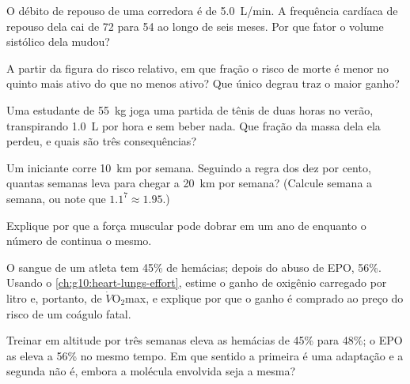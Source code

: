 \begin{exercise}[$\star\star$]\label{exo:g10:sport-and-health:7}
O débito de repouso de uma corredora é de \qty{5.0}{L/min}. A
frequência cardíaca de repouso dela cai de 72 para 54 ao longo de seis
meses. Por que fator o volume sistólico dela mudou?
\end{exercise}

\begin{exercise}[$\star\star$]\label{exo:g10:sport-and-health:8}
A partir da figura do risco relativo, em que fração o risco de morte é
menor no quinto mais ativo do que no menos ativo? Que único degrau traz
o maior ganho?
\end{exercise}

\begin{exercise}[$\star\star$]\label{exo:g10:sport-and-health:9}
Uma estudante de \qty{55}{kg} joga uma partida de tênis de duas horas
no verão, transpirando \qty{1.0}{L} por hora e sem beber nada. Que
fração da massa dela ela perdeu, e quais são três consequências?
\end{exercise}

\begin{exercise}[$\star\star$]\label{exo:g10:sport-and-health:10}
Um iniciante corre \qty{10}{km} por semana. Seguindo a regra dos dez por
cento, quantas semanas leva para chegar a \qty{20}{km} por semana?
(Calcule semana a semana, ou note que $1.1^7 \approx 1.95$.)
\end{exercise}

\begin{exercise}[$\star\star$]\label{exo:g10:sport-and-health:11}
Explique por que a força muscular pode dobrar em um ano de 
enquanto o número de  continua o mesmo.
\end{exercise}

\begin{exercise}[$\star\star\star$]\label{exo:g10:sport-and-health:12}
O sangue de um atleta tem 45\% de hemácias; depois do abuso de EPO,
56\%. Usando o \cref{ch:g10:heart-lungs-effort}, estime o ganho de
oxigênio carregado por litro e, portanto, de
$\dot V\!\mathrm{O_2}$max, e explique por que o ganho é comprado ao
preço do risco de um coágulo fatal.
\end{exercise}

\begin{exercise}[$\star\star\star$]\label{exo:g10:sport-and-health:13}
Treinar em altitude por três semanas eleva as hemácias de 45\% para
48\%; o EPO as eleva a 56\% no mesmo tempo. Em que sentido a primeira é
uma adaptação e a segunda não é, embora a molécula envolvida seja a
mesma?
\end{exercise}

